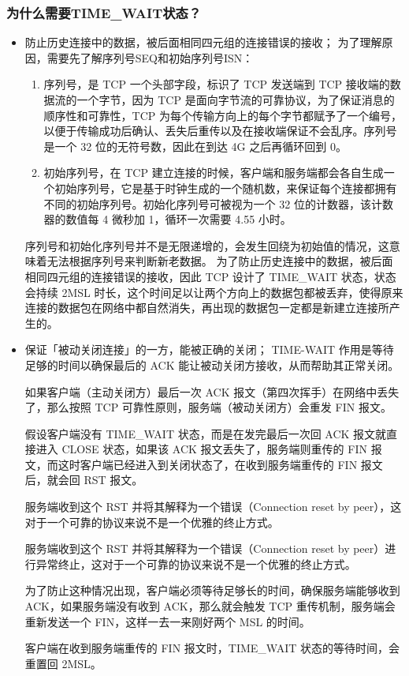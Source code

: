 \documentclass[11pt]{article}
\begin{document}
\subsubsection{为什么需要TIME\_WAIT状态？}
\label{sec:orgf40d85c}
\begin{itemize}
\item 防止历史连接中的数据，被后面相同四元组的连接错误的接收；
为了理解原因，需要先了解序列号SEQ和初始序列号ISN：
\begin{enumerate}
\item 序列号，是 TCP 一个头部字段，标识了 TCP 发送端到 TCP 接收端的数据流的一个字节，因为 TCP 是面向字节流的可靠协议，为了保证消息的顺序性和可靠性，TCP 为每个传输方向上的每个字节都赋予了一个编号，以便于传输成功后确认、丢失后重传以及在接收端保证不会乱序。序列号是一个 32 位的无符号数，因此在到达 4G 之后再循环回到 0。
\item 初始序列号，在 TCP 建立连接的时候，客户端和服务端都会各自生成一个初始序列号，它是基于时钟生成的一个随机数，来保证每个连接都拥有不同的初始序列号。初始化序列号可被视为一个 32 位的计数器，该计数器的数值每 4 微秒加 1，循环一次需要 4.55 小时。
\end{enumerate}

序列号和初始化序列号并不是无限递增的，会发生回绕为初始值的情况，这意味着无法根据序列号来判断新老数据。
为了防止历史连接中的数据，被后面相同四元组的连接错误的接收，因此 TCP 设计了 TIME\_WAIT 状态，状态会持续 2MSL 时长，这个时间足以让两个方向上的数据包都被丢弃，使得原来连接的数据包在网络中都自然消失，再出现的数据包一定都是新建立连接所产生的。

\item 保证「被动关闭连接」的一方，能被正确的关闭；
TIME-WAIT 作用是等待足够的时间以确保最后的 ACK 能让被动关闭方接收，从而帮助其正常关闭。

如果客户端（主动关闭方）最后一次 ACK 报文（第四次挥手）在网络中丢失了，那么按照 TCP 可靠性原则，服务端（被动关闭方）会重发 FIN 报文。

假设客户端没有 TIME\_WAIT 状态，而是在发完最后一次回 ACK 报文就直接进入 CLOSE 状态，如果该 ACK 报文丢失了，服务端则重传的 FIN 报文，而这时客户端已经进入到关闭状态了，在收到服务端重传的 FIN 报文后，就会回 RST 报文。

服务端收到这个 RST 并将其解释为一个错误（Connection reset by peer），这对于一个可靠的协议来说不是一个优雅的终止方式。

服务端收到这个 RST 并将其解释为一个错误（Connection reset by peer）进行异常终止，这对于一个可靠的协议来说不是一个优雅的终止方式。

为了防止这种情况出现，客户端必须等待足够长的时间，确保服务端能够收到 ACK，如果服务端没有收到 ACK，那么就会触发 TCP 重传机制，服务端会重新发送一个 FIN，这样一去一来刚好两个 MSL 的时间。

客户端在收到服务端重传的 FIN 报文时，TIME\_WAIT 状态的等待时间，会重置回 2MSL。
\end{itemize}
\end{document}
